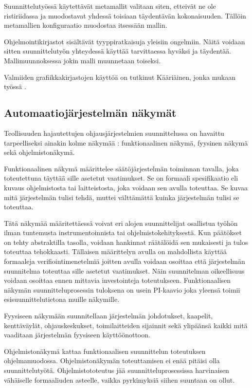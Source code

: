 \documentclass[finnish,12pt]{article}
\begin{document}
Suunnittelutyössä käytettävät metamallit valitaan siten, etteivät ne ole
ristiriidassa ja muodostavat yhdessä toisiaan täydentävän kokonaisuuden.
Tällöin metamallien konfiguraatio muodostaa itsessään mallin.

Ohjelmointikirjastot sisältävät tyyppiratkaisuja yleisiin ongelmiin.
Näitä voidaan sitten suunnittelutyön yhteydessä käyttää tarvittaessa hyväksi ja täydentää.
Mallimuunnoksessa jokin malli muunnetaan toiseksi.

Valmiiden grafiikkakirjastojen käyttöä on tutkinut Kääriäinen, jonka mukaan
työssä .

	\subsection{Automaatiojärjestelmän näkymät}

Teollisuuden hajautettujen ohjausjärjestelmien suunnittelussa on havaittu
tarpeelliseksi ainakin kolme näkymää \cite{RefWorks:38}: funktionaalinen näkymä, fyysinen näkymä sekä ohjelmistonäkymä.

Funktionaalinen näkymä määrittelee säätöjärjestelmän toiminnan tavalla, joka toteutettuna täyttää sille asetetut vaatimukset. Se on formaali spesifikaatio eli kuvaus ohjelmistosta tai laitteistosta, joka voidaan sen avulla toteuttaa. Se kuvaa mitä järjestelmän tulisi tehdä, muttei välttämättä kuinka järjestelmän tulisi se toteuttaa.

Tätä näkymää määritettäessä voivat eri alojen suunnittelijat osallistua työhön ilman
tuntemusta instrumentoinnista tai ohjelmistokehityksestä. Kun päätökset on tehty
abstraktilla tasolla, voidaan hankinnat räätälöidä sen mukaisesti ja tulos
toteuttaa tehokkaasti.
Tällaisen määrittelyn avulla on mahdollista käyttää formaaleja verifiointimenetelmiä joitten avulla
voidaan osoittaa että järjestelmän suunnitelma toteuttaa sille asetetut vaatimukset.
Näin suunnitelman oikeellisuus voidaan osoittaa ennen mittavia investointeja toteutukseen.
Funktionaalisen näkymän suunnitteluprosessin tuloksena on usein
PI-kaavio joka yleensä toimii esisuunnittelutietona muille näkymille.

Fyysiseen näkymään suunnitellaan järjestelmän johdotukset, kaapelit, kenttäväylät,
ohjauskeskukset, toimilaitteiden sijainnit sekä ylipäänsä kaikki mitä vaaditaan 
järjestelmän fyysiseen käyttöönottoon.

Ohjelmistonäkymä kattaa funktionaalisen suunnittelun toteutuksen ohjelmamuodossa.
Ohjelmistonäkymän toteuttamisen ei enää pitäisi olla suunnittelutyötä.
Ohjelmistototeutus jää suunnitteluprosessissa harvinaisen vähäiselle formaaliuden asteelle, vaikka pyrkimyksiä siihen suuntaan on ollut.
\end{document}
